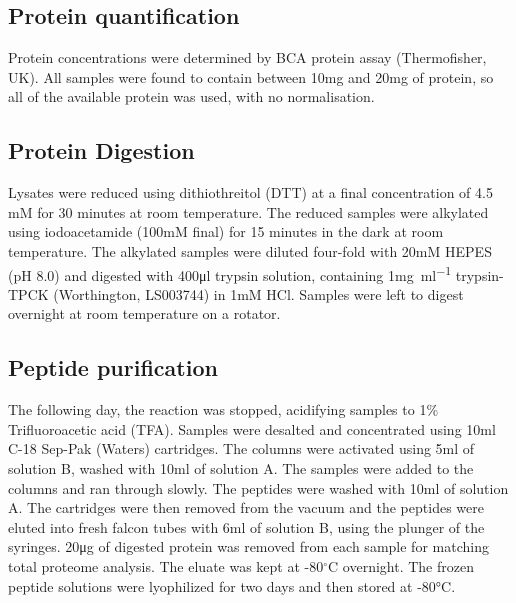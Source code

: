 \subsection{Protein quantification}
Protein concentrations were determined by BCA protein assay (Thermofisher, UK). All samples were found to contain between 10\si{\mg} and 20\si{\mg} of protein, so all of the available protein was used, with no normalisation.

\subsection{Protein Digestion}
Lysates were reduced using dithiothreitol (DTT) at a final concentration of 4.5 mM for 30 minutes at room temperature. The reduced samples were alkylated using iodoacetamide (100mM final) for 15 minutes in the dark at room temperature. The alkylated samples were diluted four-fold with 20mM HEPES (pH 8.0) and digested with 400\si{\ul} trypsin solution, containing 1\si{\mg\per\ml} trypsin-TPCK (Worthington, LS003744) in 1mM HCl. Samples were left to digest overnight at room temperature on a rotator.

\subsection{Peptide purification}
The following day, the reaction was stopped, acidifying samples to 1\% Trifluoroacetic acid (TFA). Samples were desalted and concentrated using 10ml C-18 Sep-Pak (Waters) cartridges. The columns were activated using 5ml of solution B, washed with 10ml of solution A. The samples were added to the columns and ran through slowly. The peptides were washed with 10ml of solution A. The cartridges were then removed from the vacuum and the peptides were eluted into fresh falcon tubes with 6ml of solution B, using the plunger of the syringes. 20\si{\ug} of digested protein was removed from each sample for matching total proteome analysis. The eluate was kept at -80$^{\circ}$C overnight. The frozen peptide solutions were lyophilized for two days and then stored at -80\si{\degreeCelsius}.
%

